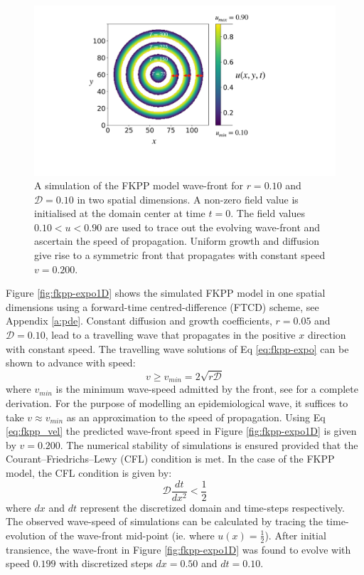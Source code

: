\begin{figure}
    \centering
    \includegraphics[scale=0.25]{chapter7/figures/figure2x.pdf}
    \caption{A simulation of the FKPP model wave-front for $r=0.10$ and $\mathcal{D}=0.10$ in two spatial dimensions. A non-zero field value is initialised at the domain center at time $t=0$. The field values $0.10 < u < 0.90$ are used to trace out the evolving wave-front and ascertain the speed of propagation. Uniform growth and diffusion give rise to a symmetric front that propagates with constant speed $v=0.200$.}
    \label{fig:fkpp-expo2D}
\end{figure}

Figure \ref{fig:fkpp-expo1D} shows the simulated FKPP model in one spatial dimensions using a forward-time centred-difference (FTCD) scheme, see Appendix \ref{a:pde}. Constant diffusion and growth coefficients, $r=0.05$ and $\mathcal{D}=0.10$, lead to a travelling wave that propagates in the positive $x$ direction with constant speed. The travelling wave solutions of Eq \ref{eq:fkpp-expo} can be shown to advance with speed:
\begin{equation}
    \label{eq:fkpp_vel}
    v \geq v_{min} = 2\sqrt{r\mathcal{D}}
\end{equation}
where $v_{min}$ is the minimum wave-speed admitted by the front, see \cite{murray1993mathematical} for a complete derivation. %
For the purpose of modelling an epidemiological wave, it suffices to take $v\approx v_{min}$ as an approximation to the speed of propagation. %
Using Eq \ref{eq:fkpp_vel} the predicted wave-front speed in Figure \ref{fig:fkpp-expo1D} is given by $v=0.200$. %
The numerical stability of simulations is ensured provided that the Courant–Friedrichs–Lewy (CFL) condition is met\cite{cfl-condition}. %
In the case of the FKPP model, the CFL condition is given by:
\begin{equation}
    \mathcal{D} \frac{dt}{dx^2} < \frac{1}{2}
\end{equation}
where $dx$ and $dt$ represent the discretized domain and time-steps respectively. %
The observed wave-speed of simulations can be calculated by %
tracing the time-evolution of the wave-front mid-point (ie. where $u(x) = \frac{1}{2}$). %
After initial transience, the wave-front in Figure  \ref{fig:fkpp-expo1D} was found to evolve with speed $0.199$ with discretized steps $dx=0.50$ and $dt=0.10$. %

